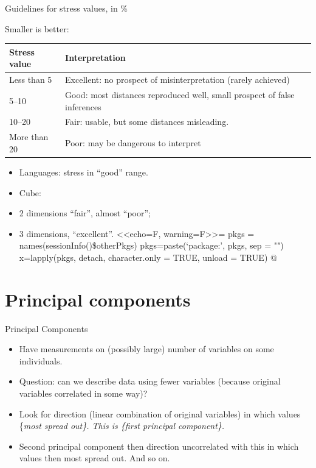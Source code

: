\documentclass[ignorenonframetext,]{beamer}
\begin{document}
\begin{frame}{Guidelines for stress values, in \%}
\protect\hypertarget{guidelines-for-stress-values-in}{}

Smaller is better:

\begin{tabular}{lp{3in}}
Stress value & Interpretation \\
\hline
Less than 5 & Excellent: no prospect of misinterpretation (rarely achieved)\\
5--10 & Good: most distances reproduced well, small prospect of false inferences\\
10--20 & Fair: usable, but some distances misleading.\\
More than 20 & Poor: may be dangerous to interpret\\
\hline
\end{tabular}

\begin{itemize}
\item
  Languages: stress in ``good'' range.
\item
  Cube:
\item
  2 dimensions ``fair'', almost ``poor'';
\item
  3 dimensions, ``excellent''. \textless{}\textless{}echo=F,
  warning=F\textgreater{}\textgreater{}= pkgs =
  names(sessionInfo()\$otherPkgs) pkgs=paste(`package:', pkgs, sep = "")
  x=lapply(pkgs, detach, character.only = TRUE, unload = TRUE) @
\end{itemize}

\section{Principal components}
\frame{\sectionpage}

\end{frame}

\begin{frame}{Principal Components}
\protect\hypertarget{principal-components}{}

\begin{itemize}
\item
  Have measurements on (possibly large) number of variables on some
  individuals.
\item
  Question: can we describe data using fewer variables (because original
  variables correlated in some way)?
\item
  Look for direction (linear combination of original variables) in which
  values \{\em most spread out\}. This is
  \{\em first principal component\}.
\item
  Second principal component then direction uncorrelated with this in
  which values then most spread out. And so on.
\end{itemize}

\end{frame}
\end{document}
